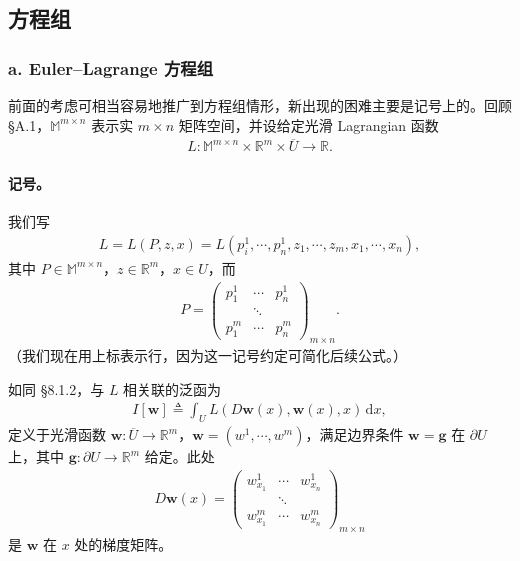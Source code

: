 \documentclass[../../main.tex]{subfiles}
\begin{document}
\subsection{方程组}\label{subsection:ch08-1-4-方程组}

\subsubsection*{a. Euler--Lagrange 方程组}

前面的考虑可相当容易地推广到方程组情形，新出现的困难主要是记号上的。回顾 \S A.1，$\mathbb{M}^{m\times n}$ 表示实 $m\times n$ 矩阵空间，并设给定光滑 Lagrangian 函数
\begin{align*}
L:\mathbb{M}^{m\times n}\times\mathbb{R}^m\times\overline{U}\to\mathbb{R}.
\end{align*}

\paragraph{记号。}我们写
\begin{align}
L=L(P,z,x)=L(p_i^1,\cdots,p_n^1,z_1,\cdots,z_m,x_1,\cdots,x_n),\label{align:ch08-1-eq15}
\end{align}
其中 $P\in\mathbb{M}^{m\times n}$，$z\in\mathbb{R}^m$，$x\in U$，而
\begin{align*}
P=\begin{pmatrix}p_1^1&\cdots&p_n^1\\&\ddots&\\p_1^m&\cdots&p_n^m\end{pmatrix}_{m\times n}.
\end{align*}
（我们现在用上标表示行，因为这一记号约定可简化后续公式。）

如同 \S8.1.2，与 $L$ 相关联的泛函为
\begin{align}
I[\mathbf{w}]\triangleq\int_U L(D\mathbf{w}(x),\mathbf{w}(x),x)\,\mathrm{d}x,\label{align:ch08-1-eq15b}
\end{align}
定义于光滑函数 $\mathbf{w}:\overline{U}\to\mathbb{R}^m$，$\mathbf{w}=(w^1,\cdots,w^m)$，满足边界条件 $\mathbf{w}=\mathbf{g}$ 在 $\partial U$ 上，其中 $\mathbf{g}:\partial U\to\mathbb{R}^m$ 给定。此处
\begin{align*}
D\mathbf{w}(x)=\begin{pmatrix}w_{x_1}^1&\cdots&w_{x_n}^1\\&\ddots&\\w_{x_1}^m&\cdots&w_{x_n}^m\end{pmatrix}_{m\times n}
\end{align*}
是 $\mathbf{w}$ 在 $x$ 处的梯度矩阵。
\end{document}
